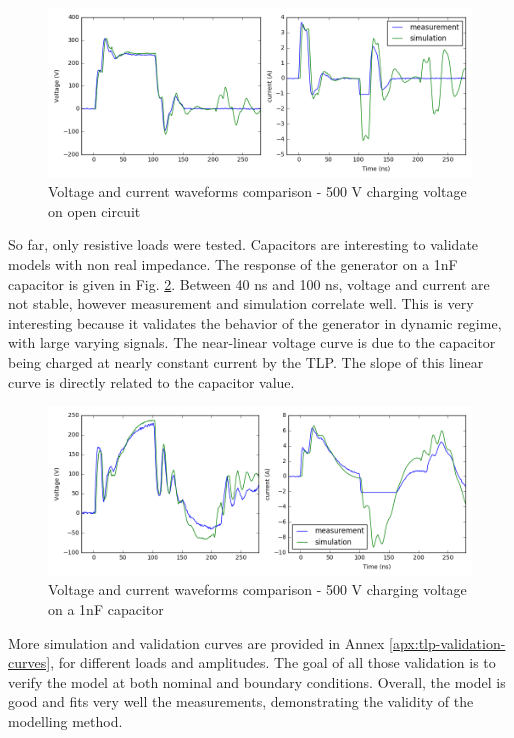 \begin{figure}[!h]
  \centering
  \includegraphics[width=\textwidth]{src/2/figures/tlp_comparison_open_500V.png}
  \caption{Voltage and current waveforms comparison - 500 V charging voltage on open circuit}
  \label{fig:comparison-tlp-open}
\end{figure}

So far, only resistive loads were tested.
Capacitors are interesting to validate models with non real impedance.
The response of the generator on a 1nF capacitor is given in Fig. \ref{fig:comparison-tlp-capa}.
Between 40 ns and 100 ns, voltage and current are not stable, however measurement and simulation correlate well.
This is very interesting because it validates the behavior of the generator in dynamic regime, with large varying signals.
The near-linear voltage curve is due to the capacitor being charged at nearly constant current by the TLP.
The slope of this linear curve is directly related to the capacitor value.

\begin{figure}[!h]
  \centering
  \includegraphics[width=\textwidth]{src/2/figures/tlp_comparison_1nF_500V.png}
  \caption{Voltage and current waveforms comparison - 500 V charging voltage on a 1nF capacitor}
  \label{fig:comparison-tlp-capa}
\end{figure}

More simulation and validation curves are provided in Annex \ref{apx:tlp-validation-curves}, for different loads and amplitudes.
The goal of all those validation is to verify the model at both nominal and boundary conditions.
Overall, the model is good and fits very well the measurements, demonstrating the validity of the modelling method.

